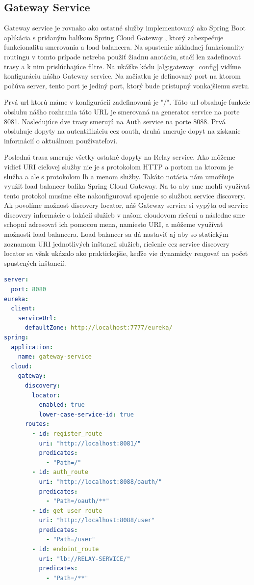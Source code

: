 \subsection{Gateway Service}
Gateway service je rovnako ako ostatné služby implementovaný ako Spring Boot aplikácia s pridaným balíkom Spring Cloud Gateway \cite{cloud_gateway}, ktorý zabezpečuje funkcionalitu smerovania a load balancera.
Na spustenie základnej funkcionality routingu v tomto prípade netreba použiť žiadnu anotáciu, stačí len zadefinovať trasy a k nim prislúchajúce filtre. Na ukážke kódu \ref{alg:gateway_config} vidíme konfiguráciu nášho Gateway service. Na začiatku je definovaný port na ktorom počúva server, tento port je jediný port, ktorý bude prístupný vonkajšiemu svetu.

Prvá \acrshort{url} ktorú máme v konfigurácií zadefinovanú je "/". Táto \acrshort{url} obsahuje funkcie obsluhu nášho rozhrania táto URL je smerovaná na generator service na porte 8081.
Nasledujúce dve trasy smerujú na Auth service na porte 8088. Prvá obsluhuje dopyty na autentifikáciu cez \acrshort{oauth}, druhá smeruje dopyt na získanie informácií o aktuálnom používateľovi.

Posledná trasa smeruje všetky ostatné dopyty na Relay service. Ako môžeme vidieť URI cieľovej služby nie je s protokolom HTTP a portom na ktorom je služba a ale s protokolom lb a menom služby. Takáto notácia nám umožňuje využiť load balancer balíka Spring Cloud Gateway. Na to aby sme mohli využívať tento protokol musíme ešte nakonfigurovať spojenie so službou service discovery. Ak povolíme možnosť discovery locator, náš Gateway service si vypýta od service discovery informácie o lokácií služieb v našom cloudovom riešení a následne sme schopní adresovať ich pomocou mena, namiesto URI, a môžeme využívať možnosti load balancera. Load balancer sa dá nastaviť aj aby so statickým zoznamom URI jednotlivých inštancii služieb, riešenie cez service discovery locator sa však ukázalo ako praktickejšie, keďže vie dynamicky reagovať na počet spustených inštancií.

\begin{lstlisting}[float, caption={Konfigurácia Gateway service},label={alg:gateway_config},language=yaml]
server:
  port: 8080
eureka:
  client:
    serviceUrl:
      defaultZone: http://localhost:7777/eureka/
spring:
  application:
    name: gateway-service
  cloud:
    gateway:
      discovery:
        locator:
          enabled: true
          lower-case-service-id: true
      routes:
        - id: register_route
          uri: "http://localhost:8081/"
          predicates:
            - "Path=/"
        - id: auth_route
          uri: "http://localhost:8088/oauth/"
          predicates:
            - "Path=/oauth/**"
        - id: get_user_route
          uri: "http://localhost:8088/user"
          predicates:
            - "Path=/user"
        - id: endoint_route
          uri: "lb://RELAY-SERVICE/"
          predicates:
            - "Path=/**"
\end{lstlisting}

